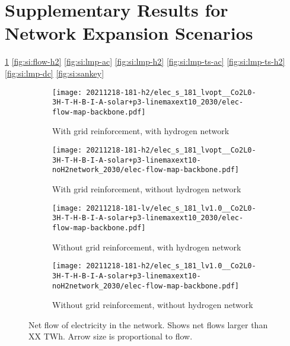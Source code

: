 \section{Supplementary Results for Network Expansion Scenarios}
\label{sec:si:results-network-expansion}

\cref{fig:si:flow-ac}
\cref{fig:si:flow-h2}
\cref{fig:si:lmp-ac}
\cref{fig:si:lmp-h2}
\cref{fig:si:lmp-ts-ac}
\cref{fig:si:lmp-ts-h2}
\cref{fig:si:lmp-dc}
\cref{fig:si:sankey}

\begin{figure}
    \begin{subfigure}{0.49\textwidth}
        \centering
        \caption{With grid reinforcement, with hydrogen network}
        \texttt{[image: 20211218-181-h2/elec\_s\_181\_lvopt\_\_Co2L0-3H-T-H-B-I-A-solar+p3-linemaxext10\_2030/elec-flow-map-backbone.pdf]}
    \end{subfigure}
    \begin{subfigure}{0.49\textwidth}
        \centering
        \caption{With grid reinforcement, without hydrogen network}
        \texttt{[image: 20211218-181-h2/elec\_s\_181\_lvopt\_\_Co2L0-3H-T-H-B-I-A-solar+p3-linemaxext10-noH2network\_2030/elec-flow-map-backbone.pdf]}
    \end{subfigure}
    \begin{subfigure}{0.49\textwidth}
        \centering
        \caption{Without grid reinforcement, with hydrogen network}
        \texttt{[image: 20211218-181-lv/elec\_s\_181\_lv1.0\_\_Co2L0-3H-T-H-B-I-A-solar+p3-linemaxext10\_2030/elec-flow-map-backbone.pdf]}
    \end{subfigure}
    \begin{subfigure}{0.49\textwidth}
        \centering
        \caption{Without grid reinforcement, without hydrogen network}
        \texttt{[image: 20211218-181-h2/elec\_s\_181\_lv1.0\_\_Co2L0-3H-T-H-B-I-A-solar+p3-linemaxext10-noH2network\_2030/elec-flow-map-backbone.pdf]}
    \end{subfigure}
    \caption{Net flow of electricity in the network. Shows net flows larger than XX TWh. Arrow size is proportional to flow.}
    \label{fig:si:flow-ac}
\end{figure}

